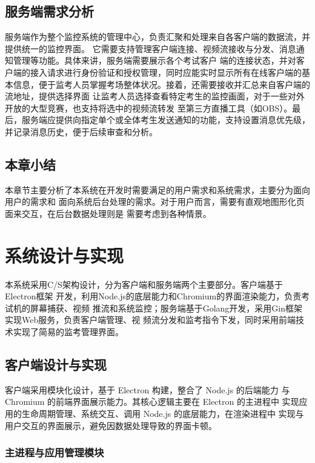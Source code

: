 \subsection{服务端需求分析}

服务端作为整个监控系统的管理中心，负责汇聚和处理来自各客户端的数据流，并提供统一的监控界面。
它需要支持管理客户端连接、视频流接收与分发、消息通知管理等功能。具体来讲，服务端需要展示各个考试客户
端的连接状态，并对客户端的接入请求进行身份验证和授权管理，同时应能实时显示所有在线客户端的基
本信息，便于监考人员掌握考场整体状况。接着，还需要接收并汇总来自客户端的流地址，提供选择界面
让监考人员选择查看特定考生的监控画面，对于一些对外开放的大型竞赛，也支持将选中的视频流转发
至第三方直播工具（如OBS）。最后，服务端应提供向指定单个或全体考生发送通知的功能，支持设置消息优先级，
并记录消息历史，便于后续审查和分析。

\subsection{本章小结}

本章节主要分析了本系统在开发时需要满足的用户需求和系统需求，主要分为面向用户的需求和
面向系统后台处理的需求。对于用户而言，需要有直观地图形化页面来交互，在后台数据处理则是
需要考虑到各种情景。

\newpage    %

\section{系统设计与实现}

本系统采用C/S架构设计，分为客户端和服务端两个主要部分。客户端基于Electron框架
开发，利用Node.js的底层能力和Chromium的界面渲染能力，负责考试机的屏幕捕获、视频
推流和系统监控；服务端基于Golang开发，采用Gin框架实现Web服务，负责客户端管理、视
频流分发和监考指令下发，同时采用前端技术实现了简易的监考管理界面。

\subsection{客户端设计与实现}

客户端采用模块化设计，基于 Electron 构建，整合了 Node.js 的后端能力
与 Chromium 的前端界面展示能力。其核心逻辑主要在 Electron 的主进程中
实现应用的生命周期管理、系统交互、调用 Node.js 的底层能力，在渲染进程中
实现与用户交互的界面展示，避免因数据处理导致的界面卡顿。

\subsubsection{主进程与应用管理模块}

